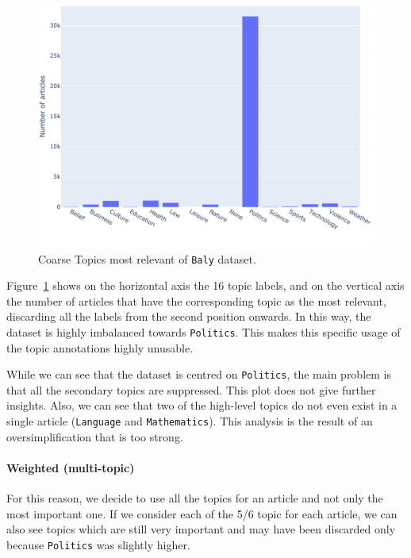 \begin{figure}[!htbp]
    \centering
    \includegraphics[trim={0cm 1cm 0cm 0cm},clip,width=\linewidth]{figures/baly_coarse_first.pdf}
    \caption{Coarse Topics most relevant of \texttt{Baly} dataset.}
    \label{fig:baly_coarse_first}
\end{figure}

Figure~\ref{fig:baly_coarse_first} shows on the horizontal axis the 16 topic labels, and on the vertical axis the number of articles that have the corresponding topic as the most relevant, discarding all the labels from the second position onwards.
In this way, the dataset is highly imbalanced towards \texttt{Politics}. This makes this specific usage of the topic annotations highly unusable.

While we can see that the dataset is centred on \texttt{Politics}, the main problem is that all the secondary topics are suppressed.
This plot does not give further insights.
Also, we can see that two of the high-level topics do not even exist in a single article (\texttt{Language} and \texttt{Mathematics}).
This analysis is the result of an oversimplification that is too strong.

\paragraph{Weighted (multi-topic)}

For this reason, we decide to use all the topics for an article and not only the most important one.
If we consider each of the 5/6 topic for each article, we can also see topics which are still very important and may have been discarded only because \texttt{Politics} was slightly higher.

